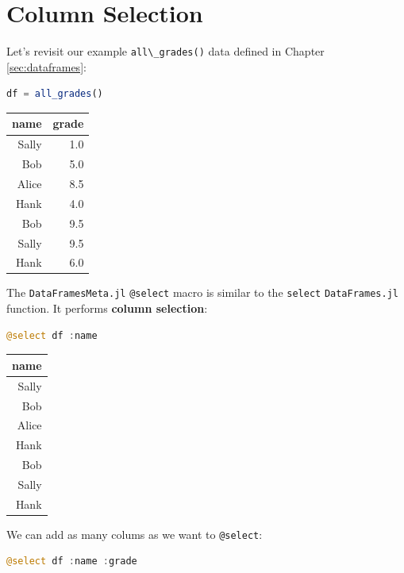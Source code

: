 \documentclass[
  notoc %
]{tufte-book}
\newcommand{\passthrough}[1]{#1}
\begin{document}
\hypertarget{sec:dataframesmeta_select}{%
\section{Column Selection}\label{sec:dataframesmeta_select}}

Let's revisit our example \passthrough{\lstinline!all\_grades()!} data
defined in Chapter \ref{sec:dataframes}:

\begin{lstlisting}[language=Julia]
df = all_grades()
\end{lstlisting}

\begin{longtable}[]{@{}rr@{}}
\toprule
name & grade \\
\midrule
\endhead
Sally & 1.0 \\
Bob & 5.0 \\
Alice & 8.5 \\
Hank & 4.0 \\
Bob & 9.5 \\
Sally & 9.5 \\
Hank & 6.0 \\
\bottomrule
\end{longtable}

The \passthrough{\lstinline!DataFramesMeta.jl!}
\passthrough{\lstinline!@select!} macro is similar to the
\passthrough{\lstinline!select!} \passthrough{\lstinline!DataFrames.jl!}
function. It performs \textbf{column selection}:

\begin{lstlisting}[language=Julia]
@select df :name
\end{lstlisting}

\begin{longtable}[]{@{}r@{}}
\toprule
name \\
\midrule
\endhead
Sally \\
Bob \\
Alice \\
Hank \\
Bob \\
Sally \\
Hank \\
\bottomrule
\end{longtable}

We can add as many colums as we want to
\passthrough{\lstinline!@select!}:

\begin{lstlisting}[language=Julia]
@select df :name :grade
\end{lstlisting}
\end{document}

